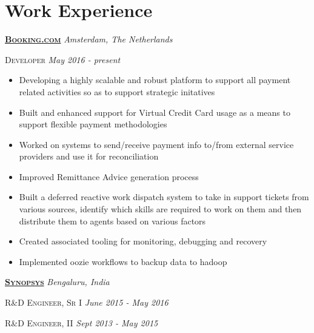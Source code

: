 \documentclass[]{article}
\begin{document}
{{{\section{Work Experience}

{\raggedright\textsc{\textbf{\href{https://www.booking.com/}{Booking.com}}} \hfill {\raggedleft\textit{Amsterdam, The Netherlands}}

{\raggedright\textsc{Developer} \hfill {\raggedleft\textit{May 2016 - present}}

\begin{itemize}[noitemsep,nolistsep]
\item Developing a highly scalable and robust platform to support all payment related activities so as to support strategic initatives
\item Built and enhanced support for Virtual Credit Card usage as a means to support flexible payment methodologies
\item Worked on systems to send/receive payment info to/from external service providers and use it for reconciliation
\item Improved Remittance Advice generation process
\item Built a deferred reactive work dispatch system to take in support tickets from various sources, identify which skills are required to work on them and then distribute them to agents based on various factors
\item Created associated tooling for monitoring, debugging and recovery
\item Implemented oozie workflows to backup data to hadoop
\end{itemize}

\vspace*{1\baselineskip}

{\raggedright\textsc{\textbf{\href{https://www.synopsys.com/}{Synopsys}}} \hfill {\raggedleft\textit{Bengaluru, India}}

{\raggedright\textsc{R\&D Engineer, Sr I} \hfill {\raggedleft\textit{June 2015 - May 2016}}

{\raggedright\textsc{R\&D Engineer, II} \hfill {\raggedleft\textit{Sept 2013 - May 2015}}

}}}}}}}}
\end{document}
